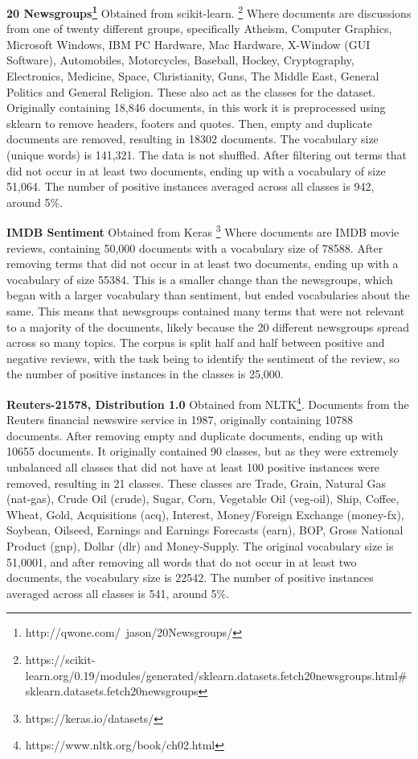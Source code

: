 \textbf{20 Newsgroups\footnote{http://qwone.com/~jason/20Newsgroups/}} Obtained from scikit-learn. \footnote{https://scikit-learn.org/0.19/modules/generated/sklearn.datasets.fetch\textunderscore20newsgroups.html\#sklearn.datasets.fetch\textunderscore20newsgroups} Where documents are discussions from one of twenty different groups, specifically Atheism, Computer Graphics, Microsoft Windows, IBM PC Hardware, Mac Hardware, X-Window (GUI Software), Automobiles, Motorcycles, Baseball, Hockey, Cryptography, Electronics, Medicine, Space, Christianity, Guns, The Middle East, General Politics and General Religion. These also act as the classes for the dataset. Originally containing 18,846 documents, in this work it is preprocessed using sklearn to remove headers, footers and quotes. Then, empty and duplicate documents are removed, resulting in 18302 documents. The vocabulary size (unique words) is 141,321. The data is not shuffled. After filtering out terms that did not occur in at least two documents, ending up with a vocabulary of size 51,064. The number of positive instances averaged across all classes is 942, around 5\%.

\textbf{IMDB Sentiment} Obtained from Keras \footnote{https://keras.io/datasets/} Where documents are IMDB movie reviews, containing 50,000 documents with a vocabulary size of 78588. After removing terms that did not occur in at least two documents, ending up with a vocabulary of size 55384. This is a smaller change than the newsgroups, which began with a larger vocabulary than sentiment, but ended vocabularies about the same. This means that newsgroups contained many terms that were not relevant to a majority of the documents, likely because the 20 different newsgroups spread across so many topics. The corpus is split half and half between positive and negative reviews, with the task being to identify the sentiment of the review, so the number of positive instances in the classes is 25,000.

\textbf{Reuters-21578, Distribution 1.0} Obtained from NLTK\footnote{https://www.nltk.org/book/ch02.html}. Documents from the Reuters financial newswire service in 1987,  originally containing 10788 documents. After removing empty and duplicate documents, ending up with 10655 documents. It originally contained 90 classes, but as they were extremely unbalanced all classes that did not have at least 100 positive instances were removed, resulting in 21 classes. These classes are Trade, Grain, Natural Gas (nat-gas), Crude Oil (crude), Sugar, Corn, Vegetable Oil (veg-oil), Ship, Coffee, Wheat, Gold, Acquisitions (acq), Interest, Money/Foreign Exchange (money-fx), Soybean, Oilseed, Earnings and Earnings Forecasts (earn), BOP, Gross National Product (gnp), Dollar (dlr) and Money-Supply.   The original vocabulary size is 51,0001, and after removing all words that do not occur in at least two documents, the vocabulary size is 22542. The number of positive instances averaged across all classes is 541, around 5\%. 

